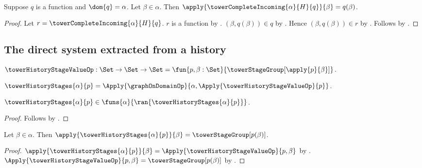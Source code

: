 \begin{proposition}\label{tower_complete_incoming_earlier}
    Suppose $q$ is a function and $\dom{q}=\alpha$.
    Let $\beta\in\alpha$.
    Then $\apply{\towerCompleteIncoming{\alpha}{H}{q}}{\beta}
        =q(\beta)$.
\end{proposition}
\begin{proof}
    Let $r=\towerCompleteIncoming{\alpha}{H}{q}$.
    $r$ is a function by
        .
    $(\beta,q(\beta))\in q$ by
        .
    Hence $(\beta,q(\beta))\in r$ by
        .
    Follows by .
\end{proof}

\subsection{The direct system extracted from a history}

\begin{definition}\label{tower_history_stage_value_op}
    $\towerHistoryStageValueOp:\Set\to\Set\to\Set
        =\fun{p,\beta:\Set}{
            \towerStageGroup[\apply{p}{\beta}]}$.
\end{definition}

\begin{definition}\label{tower_history_stages}
    $\towerHistoryStages{\alpha}{p}=
        \Apply{\graphOnDomainOp}{\alpha,
            \Apply{\towerHistoryStageValueOp}{p}}$.
\end{definition}

\begin{proposition}\label{tower_history_stages_type}
    $\towerHistoryStages{\alpha}{p}\in
        \funs{\alpha}{\ran{\towerHistoryStages{\alpha}{p}}}$.
\end{proposition}
\begin{proof}
    Follows by
        .
\end{proof}

\begin{proposition}\label{tower_history_stages_apply}
    Let $\beta\in\alpha$.
    Then $\apply{\towerHistoryStages{\alpha}{p}}{\beta}=
        \towerStageGroup[p(\beta)]$.
\end{proposition}
\begin{proof}
    $\apply{\towerHistoryStages{\alpha}{p}}{\beta}
        =\Apply{\towerHistoryStageValueOp}{p,\beta}$ by
        .
    $\Apply{\towerHistoryStageValueOp}{p,\beta}
        =\towerStageGroup[p(\beta)]$ by
        .
\end{proof}

